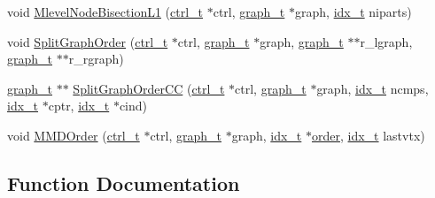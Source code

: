 \begin{DoxyCompactItemize}
\item 
void \hyperlink{a00933_aeeaa7f4ed9878ae2f7faff0e2402fd87}{Mlevel\+Node\+Bisection\+L1} (\hyperlink{a00742}{ctrl\+\_\+t} $\ast$ctrl, \hyperlink{a00734}{graph\+\_\+t} $\ast$graph, \hyperlink{a00876_aaa5262be3e700770163401acb0150f52}{idx\+\_\+t} niparts)
\item 
void \hyperlink{a00933_a2554253b42e739ac3bb63e676741e1cd}{Split\+Graph\+Order} (\hyperlink{a00742}{ctrl\+\_\+t} $\ast$ctrl, \hyperlink{a00734}{graph\+\_\+t} $\ast$graph, \hyperlink{a00734}{graph\+\_\+t} $\ast$$\ast$r\+\_\+lgraph, \hyperlink{a00734}{graph\+\_\+t} $\ast$$\ast$r\+\_\+rgraph)
\item 
\hyperlink{a00734}{graph\+\_\+t} $\ast$$\ast$ \hyperlink{a00933_a52a083cfb474124f22728e79cfba695f}{Split\+Graph\+Order\+CC} (\hyperlink{a00742}{ctrl\+\_\+t} $\ast$ctrl, \hyperlink{a00734}{graph\+\_\+t} $\ast$graph, \hyperlink{a00876_aaa5262be3e700770163401acb0150f52}{idx\+\_\+t} ncmps, \hyperlink{a00876_aaa5262be3e700770163401acb0150f52}{idx\+\_\+t} $\ast$cptr, \hyperlink{a00876_aaa5262be3e700770163401acb0150f52}{idx\+\_\+t} $\ast$cind)
\item 
void \hyperlink{a00933_acafb70c0e49cde8105dc62f6c34dfa6c}{M\+M\+D\+Order} (\hyperlink{a00742}{ctrl\+\_\+t} $\ast$ctrl, \hyperlink{a00734}{graph\+\_\+t} $\ast$graph, \hyperlink{a00876_aaa5262be3e700770163401acb0150f52}{idx\+\_\+t} $\ast$\hyperlink{a00611_aab21ede0c02820806e77fd7890ee6bd7}{order}, \hyperlink{a00876_aaa5262be3e700770163401acb0150f52}{idx\+\_\+t} lastvtx)
\end{DoxyCompactItemize}


\subsection{Function Documentation}
\mbox{\label{a00933_a8304f0dd6d180587f73b0b70de3b01b7}} 
